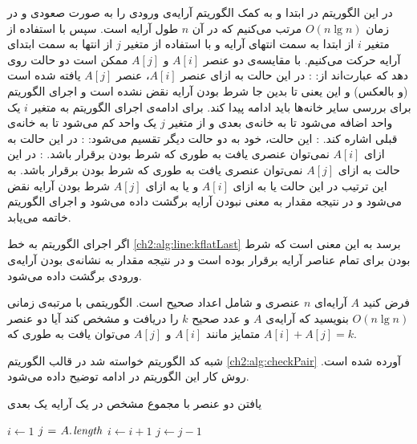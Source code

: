 در این الگوریتم در ابتدا و به کمک الگوریتم {} آرایه‌ی ورودی را به صورت صعودی و در زمان {$O(n\lg n)$} مرتب می‌کنیم که در آن {$n$} طول آرایه است. سپس با استفاده از متغیر {$i$} از ابتدا به سمت انتهای آرایه و با استفاده از متغیر {$j$} از انتها به سمت ابتدای آرایه‌ حرکت می‌کنیم. با مقایسه‌ی دو عنصر {$A[i]$} و {$A[j]$} ممکن است دو حالت روی دهد که عبارت‌اند از:
: در این حالت به ازای عنصر {$A[i]$}، عنصر {$A[j]$} یافته شده است (و بالعکس) و این یعنی تا بدین جا شرط
 {} بودن آرایه نقض نشده است و اجرای الگوریتم برای بررسی سایر خانه‌ها باید ادامه پیدا کند. برای ادامه‌ی اجرای الگوریتم به متغیر {$i$} یک واحد اضافه می‌شود تا به خانه‌ی بعدی و از متغیر {$j$} یک واحد کم می‌شود تا به خانه‌ی قبلی اشاره کند.
: این حالت، خود به دو حالت دیگر تقسیم می‌شود:
: در این حالت به ازای {$A[i]$} نمی‌توان عنصری یافت به طوری که شرط {} بودن برقرار باشد. 
: در این حالت به ازای {$A[j]$} نمی‌توان عنصری یافت به طوری که شرط {} بودن برقرار باشد. 
به این ترتیب در این حالت یا به ازای {$A[i]$} و یا به ازای {$A[j]$} شرط {} بودن آرایه نقض می‌شود و در نتیجه مقدار {} به معنی {} نبودن آرایه برگشت داده می‌شود و اجرای الگوریتم خاتمه می‌یابد.

اگر اجرای الگوریتم به خط {\ref{ch2:alg:line:kflatLast}} برسد به این معنی است که شرط {} بودن برای تمام عناصر آرایه برقرار بوده است و در نتیجه مقدار {} به نشانه‌ی {} بودن آرایه‌ی ورودی برگشت داده می‌شود.

 فرض کنید {$A$} آرایه‌ای {$n$} عنصری و شامل اعداد صحیح است. الگوریتمی با مرتبه‌ی زمانی {$O(n\lg n)$} بنویسید که آرایه‌‌ی {$A$} و عدد صحیح {$k$} را دریافت و مشخص کند آیا دو عنصر متمایز مانند {$A[i]$} و {$A[j]$} می‌توان یافت به طوری که {$A[i]+A[j]=k$}.


شبه کد الگوریتم خواسته شد در قالب الگوریتم {\eqref{ch2:alg:checkPair}} آورده شده است. روش کار این الگوریتم در ادامه توضیح داده می‌شود.

\begin{algorithm}
\caption{یافتن دو عنصر با مجموع مشخص در یک آرایه یک بعدی}\label{ch2:alg:checkPair}
\begin{latin}
\begin{algorithmic}[1]
		\State	{}
		\State 	$i \gets 1$
		\State 	$j \mathrel{\hspace{1pt}=\hspace{1pt}} A.\hspace*{1pt}\mathit{length}$
					\State	\Return {}
					\State	$i \gets i+1$
				\Else
					\State	$j \gets j-1$
				\EndIf
		\EndWhile
		\State \Return {}\label{ch2:alg:ln:chkPairLast}
\EndFunction
\end{algorithmic}
\end{latin}
\end{algorithm}

